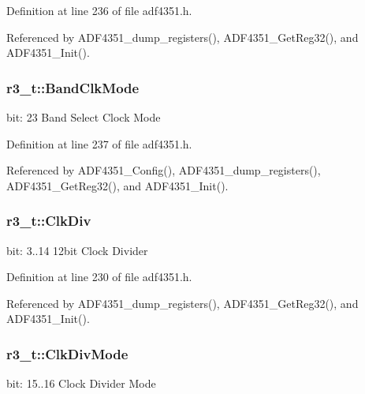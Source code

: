 Definition at line 236 of file adf4351.\+h.



Referenced by A\+D\+F4351\+\_\+dump\+\_\+registers(), A\+D\+F4351\+\_\+\+Get\+Reg32(), and A\+D\+F4351\+\_\+\+Init().

\subsubsection[{\texorpdfstring{Band\+Clk\+Mode}{BandClkMode}}]{ r3\+\_\+t\+::\+Band\+Clk\+Mode}\hypertarget{structr3__t_a47117d4da83d72bd3e84a4f1f9804120}{}\label{structr3__t_a47117d4da83d72bd3e84a4f1f9804120}
bit\+: 23 Band Select Clock Mode 

Definition at line 237 of file adf4351.\+h.



Referenced by A\+D\+F4351\+\_\+\+Config(), A\+D\+F4351\+\_\+dump\+\_\+registers(), A\+D\+F4351\+\_\+\+Get\+Reg32(), and A\+D\+F4351\+\_\+\+Init().

\subsubsection[{\texorpdfstring{Clk\+Div}{ClkDiv}}]{ r3\+\_\+t\+::\+Clk\+Div}\hypertarget{structr3__t_ad53a3132e2a6601f80cb4e455a4dea49}{}\label{structr3__t_ad53a3132e2a6601f80cb4e455a4dea49}
bit\+: 3..14 12bit Clock Divider 

Definition at line 230 of file adf4351.\+h.



Referenced by A\+D\+F4351\+\_\+dump\+\_\+registers(), A\+D\+F4351\+\_\+\+Get\+Reg32(), and A\+D\+F4351\+\_\+\+Init().

\subsubsection[{\texorpdfstring{Clk\+Div\+Mode}{ClkDivMode}}]{ r3\+\_\+t\+::\+Clk\+Div\+Mode}\hypertarget{structr3__t_a29d101adb2cb66623bba16d9783cf752}{}\label{structr3__t_a29d101adb2cb66623bba16d9783cf752}
bit\+: 15..16 Clock Divider Mode 


